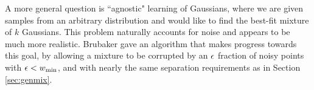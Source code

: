 \documentclass{book}
\numberwithin{exercise}{chapter}
\begin{document}
A more general question is ``agnostic" learning of Gaussians, where we are given samples from an arbitrary distribution and would like to find the best-fit mixture of $k$ Gaussians. This problem naturally accounts for noise and appears to be much more realistic. Brubaker \cite{Brubaker2009a} gave an algorithm that makes progress towards this goal, by allowing a mixture to be corrupted by an $\epsilon$ fraction of noisy points with $\epsilon < w_{\min}$, and with nearly the same separation requirements as in Section \ref{sec:genmix}.



\end{document}
